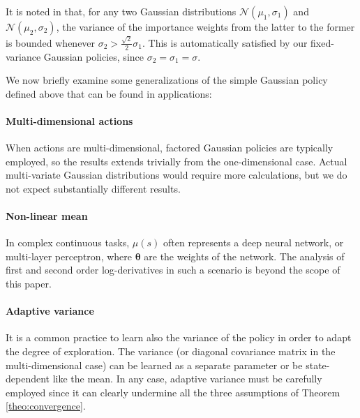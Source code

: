 \documentclass{article}
\theoremstyle{remark}
\theoremstyle{definition}
\newcommand{\vtheta}{\boldsymbol{\theta}}
\begin{document}
\varweights*
It is noted in \cite{cortes2010learning} that, for any two Gaussian distributions $\mathcal{N}(\mu_1,\sigma_1)$ and $\mathcal{N}(\mu_2,\sigma_2)$, the variance of the importance weights from the latter to the former is bounded whenever $\sigma_2 > \frac{\sqrt{2}}{2}\sigma_1$. This is automatically satisfied by our fixed-variance Gaussian policies, since $\sigma_2=\sigma_1=\sigma$.

We now briefly examine some generalizations of the simple Gaussian policy defined above that can be found in applications:

\paragraph{Multi-dimensional actions}
When actions are multi-dimensional, factored Gaussian policies are typically employed, so the results extends trivially from the one-dimensional case. Actual multi-variate Gaussian distributions would require more calculations, but we do not expect substantially different results.

\paragraph{Non-linear mean}
In complex continuous tasks, $\mu(s)$ often represents a deep neural network, or multi-layer perceptron, where $\vtheta$ are the weights of the network. The analysis of first and second order log-derivatives in such a scenario is beyond the scope of this paper.

\paragraph{Adaptive variance}
It is a common practice to learn also the variance of the policy in order to adapt the degree of exploration. The variance (or diagonal covariance matrix in the multi-dimensional case) can be learned as a separate parameter or be state-dependent like the mean. In any case, adaptive variance must be carefully employed since it can clearly undermine all the three assumptions of Theorem \ref{theo:convergence}.
\end{document}
